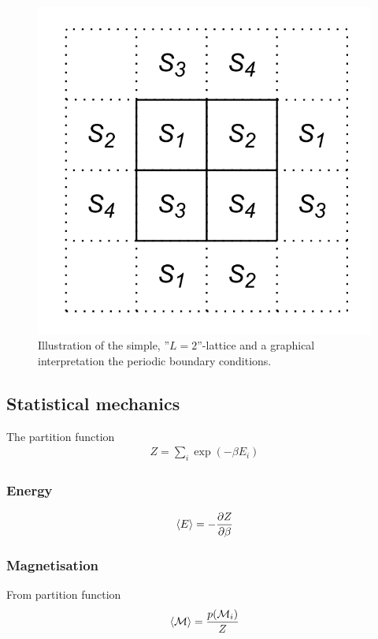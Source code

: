 \documentclass[11pt,a4paper,english]{article}
\numberwithin{equation}{section}
\newcommand{\magM}{\mathcal{M}}
\begin{document}
\begin{figure}[H]
\centering
\includegraphics[scale=0.15]{pics/simple_lattice.png}
\caption{ Illustration of the simple, ''$L=2$''-lattice and a graphical interpretation the periodic boundary conditions.}
\label{fig:spin_neighbours}
\end{figure}

\subsection{Statistical mechanics}
The partition function
\begin{gather}
Z = \sum_i \exp(-\beta E_i)
\end{gather}

\subsubsection{Energy}

\begin{gather}
\expval{E} = -\frac{\partial Z}{\partial \beta}
\end{gather}


\subsubsection{Magnetisation}
From partition function
\begin{gather}
\expval{\magM} = \frac{p(\magM_i)}{Z}
\end{gather}
\end{document}
